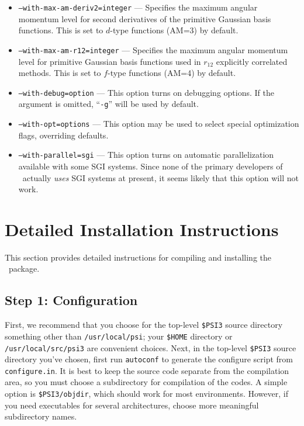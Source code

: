 \documentclass[12pt]{article}
\begin{document}
\begin{itemize}
\item {\tt --with-max-am-deriv2=integer} --- Specifies the maximum
  angular momentum level for second derivatives of the primitive
  Gaussian basis functions.  This is set to $d$-type functions (AM=3)
  by default.
\item {\tt --with-max-am-r12=integer} --- Specifies the maximum
  angular momentum level for primitive Gaussian basis functions used
  in $r_{12}$ explicitly correlated methods.  This is set to $f$-type
  functions (AM=4) by default.
\item {\tt --with-debug=option} --- This option turns on debugging
  options.  If the argument is omitted, ``{\tt -g}'' will be used by default.
\item {\tt --with-opt=options} --- This option may be used to select
  special optimization flags, overriding defaults.
\item {\tt --with-parallel=sgi} --- This option turns on automatic
  parallelization available with some SGI systems.  Since none of the
  primary developers of \PSIthree\ actually {\em uses} SGI systems at
  present, it seems likely that this option will not work.
\end{itemize}

\section{Detailed Installation Instructions}

This section provides detailed instructions for compiling and
installing the \PSIthree\ package.  

\subsection{Step 1: Configuration}

First, we recommend that you choose for the top-level {\tt \$PSI3} source
directory something other than {\tt /usr/local/psi}; your {\tt \$HOME}
directory or {\tt /usr/local/src/psi3} are convenient choices.  Next,
in the top-level {\tt \$PSI3} source directory you've chosen, first run
{\tt autoconf} to generate the configure script from {\tt configure.in}.
It is best to keep the source code separate from the compilation area,
so you must choose a subdirectory for compilation of the codes.  A simple
option is {\tt \$PSI3/objdir}, which should work for most environments.
However, if you need executables for several architectures, choose more
meaningful subdirectory names.
\end{document}
